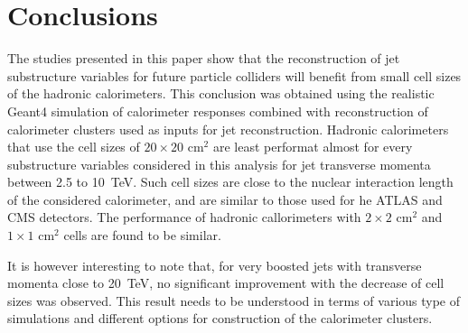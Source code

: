 \section{Conclusions}
The studies presented in this paper show that the reconstruction of jet substructure 
variables for future particle colliders will benefit from small cell sizes of the hadronic calorimeters. 
This conclusion was obtained using the realistic Geant4 simulation of calorimeter responses combined with reconstruction of 
calorimeter clusters used as inputs for jet reconstruction. 
Hadronic calorimeters that use the cell sizes of $20\times 20$  cm$^2$ are least performat almost for every 
substructure variables considered in this analysis for jet transverse momenta between 2.5 to 10~TeV. 
Such cell sizes are close to the nuclear interaction length of the considered calorimeter, 
and are similar to those used for he ATLAS and CMS detectors. The performance 
of hadronic callorimeters with $2\times 2$  cm$^2$ and $1\times 1$  cm$^2$ cells are found to be similar.
 

It is however interesting to note that,  for very boosted jets with transverse momenta close to 20~TeV, no significant improvement with the 
decrease of cell sizes was observed. This result needs to be understood in terms of various type of simulations and 
different options for construction of the calorimeter clusters.


